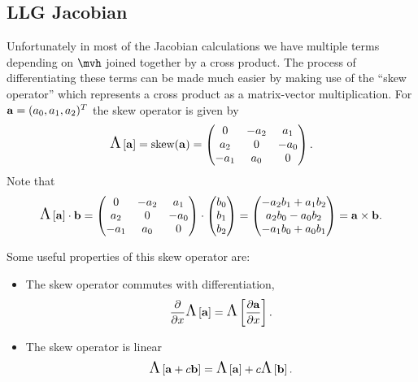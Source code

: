 {\subsection{LLG Jacobian}
\label{sec:llg-jacobian}

Unfortunately in most of the Jacobian calculations we have multiple terms depending on $\mvh$ joined together by a cross product.
The process of differentiating these terms can be made much easier by making use of the ``skew operator'' which represents a cross product as a matrix-vector multiplication.
For ${\boldsymbol{\mathrm{a}}} = (a_0, a_1, a_2)^T$ the skew operator is given by
\begin{equation}
  \text{\Large{$\Lambda$}}\left[ {\boldsymbol{\mathrm{a}}} \right] = \text{skew}({\boldsymbol{\mathrm{a}}}) =
  \begin{pmatrix}
    0 & -a_2 & a_1 \\
    a_2 & 0 & -a_0 \\
    -a_1 & a_0 & 0
  \end{pmatrix}.
  \label{eqn:skew}
\end{equation}
Note that
\begin{equation}
  \text{\Large{$\Lambda$}}\left[ {\boldsymbol{\mathrm{a}}} \right] \cdot {\boldsymbol{\mathrm{b}}}
  = \begin{pmatrix}
    0 & -a_2 & a_1 \\
    a_2 & 0 & -a_0 \\
    -a_1 & a_0 & 0
  \end{pmatrix}
  \cdot \begin{pmatrix} b_0 \\ b_1 \\ b_2 \end{pmatrix}
  = \begin{pmatrix} -a_2b_1 + a_1b_2 \\ a_2b_0 - a_0b_2 \\ -a_1b_0 + a_0b_1 \end{pmatrix}
  = {\boldsymbol{\mathrm{a}}} \times {\boldsymbol{\mathrm{b}}}.
\end{equation}

Some useful properties of this skew operator are:
\begin{itemize}
\item The skew operator commutes with differentiation, \ie
  \begin{equation}
    \frac{\partial }{\partial x} \text{\Large{$\Lambda$}}\left[ {\boldsymbol{\mathrm{a}}} \right] = \text{\Large{$\Lambda$}}\left[  \frac{\partial {\boldsymbol{\mathrm{a}}}}{\partial x}  \right].
  \end{equation}

\item The skew operator is linear
  \begin{equation}
    \text{\Large{$\Lambda$}}\left[ {\boldsymbol{\mathrm{a}}} + c {\boldsymbol{\mathrm{b}}} \right] = \text{\Large{$\Lambda$}}\left[ {\boldsymbol{\mathrm{a}}} \right] + c \text{\Large{$\Lambda$}}\left[ {\boldsymbol{\mathrm{b}}} \right].
  \end{equation}


\end{itemize}}
